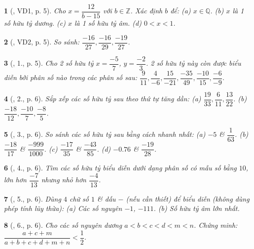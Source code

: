 \documentclass{article}
\newtheorem{baitoan}{}
\begin{document}
\begin{baitoan}[\cite{Tuyen_Toan_7}, VD1, p. 5]
	Cho $x = \dfrac{12}{b - 15}$ với $b\in\mathbb{Z}$. Xác định $b$ để: (a) $x\in\mathbb{Q}$. (b) $x$ là 1 số hữu tỷ dương. (c) $x$ là 1 số hữu tỷ âm. (d) $0 < x < 1$.
\end{baitoan}

\begin{baitoan}[\cite{Tuyen_Toan_7}, VD2, p. 5]
	So sánh: $\dfrac{-16}{27},\dfrac{-16}{29},\dfrac{-19}{27}$.
\end{baitoan}

\begin{baitoan}[\cite{Tuyen_Toan_7}, 1., p. 5]
	Cho 2 số hữu tỷ $x = \dfrac{-5}{7}$, $y = \dfrac{-2}{3}$. 2 số hữu tỷ này còn được biểu diễn bởi phân số nào trong các phân số sau: $\dfrac{9}{11},\dfrac{4}{-6},\dfrac{15}{-21},\dfrac{-35}{49},\dfrac{-10}{15},\dfrac{-6}{-9}$.
\end{baitoan}

\begin{baitoan}[\cite{Tuyen_Toan_7}, 2., p. 6]
	Sắp xếp các số hữu tỷ sau theo thứ tự tăng dần: (a) $\dfrac{19}{33},\dfrac{6}{11},\dfrac{13}{22}$. (b) $\dfrac{-18}{12},\dfrac{-10}{7},\dfrac{-8}{5}$.
\end{baitoan}

\begin{baitoan}[\cite{Tuyen_Toan_7}, 3., p. 6]
	So sánh các số hữu tỷ sau bằng cách nhanh nhất: (a) $-5$ \& $\dfrac{1}{63}$. (b) $\dfrac{-18}{17}$ \& $\dfrac{-999}{1000}$. (c) $\dfrac{-17}{35}$ \& $\dfrac{-43}{85}$. (d) $-0.76$ \& $\dfrac{-19}{28}$.
\end{baitoan}

\begin{baitoan}[\cite{Tuyen_Toan_7}, 4., p. 6]
	Tìm các số hữu tỷ biểu diễn dưới dạng phân số có mẫu số bằng $10$, lớn hơn $\dfrac{-7}{13}$ nhưng nhỏ hơn $\dfrac{-4}{13}$.
\end{baitoan}

\begin{baitoan}[\cite{Tuyen_Toan_7}, 5., p. 6]
	Dùng $4$ chữ số $1$ \& dấu $-$ (nếu cần thiết) để biểu diễn (không dùng phép tính lũy thừa): (a) Các số nguyên $-1$, $-111$. (b) Số hữu tỷ âm lớn nhất.
\end{baitoan}

\begin{baitoan}[\cite{Tuyen_Toan_7}, 6., p. 6]
	Cho các số nguyên dương $a < b < c < d < m < n$. Chứng minh: $\dfrac{a + c + m}{ a + b + c + d + m + n} < \dfrac{1}{2}$.
\end{baitoan}
\end{document}
